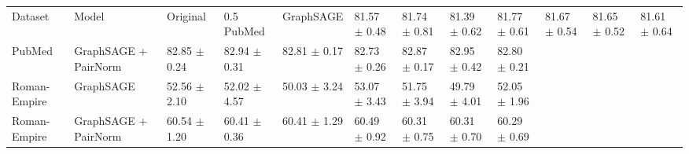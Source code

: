 \begin{tabular}{lllllllll}
\toprule
Dataset & Model & Original & 0.5%
\midrule
PubMed & GraphSAGE & 81.57 $\pm$ 0.48 & 81.74 $\pm$ 0.81 & 81.39 $\pm$ 0.62 & 81.77 $\pm$ 0.61 & 81.67 $\pm$ 0.54 & 81.65 $\pm$ 0.52 & 81.61 $\pm$ 0.64 \\
PubMed & GraphSAGE + PairNorm & 82.85 $\pm$ 0.24 & 82.94 $\pm$ 0.31 & 82.81 $\pm$ 0.17 & 82.73 $\pm$ 0.26 & 82.87 $\pm$ 0.17 & 82.95 $\pm$ 0.42 & 82.80 $\pm$ 0.21 \\
Roman-Empire & GraphSAGE & 52.56 $\pm$ 2.10 & 52.02 $\pm$ 4.57 & 50.03 $\pm$ 3.24 & 53.07 $\pm$ 3.43 & 51.75 $\pm$ 3.94 & 49.79 $\pm$ 4.01 & 52.05 $\pm$ 1.96 \\
Roman-Empire & GraphSAGE + PairNorm & 60.54 $\pm$ 1.20 & 60.41 $\pm$ 0.36 & 60.41 $\pm$ 1.29 & 60.49 $\pm$ 0.92 & 60.31 $\pm$ 0.75 & 60.31 $\pm$ 0.70 & 60.29 $\pm$ 0.69 \\
\bottomrule
\end{tabular}
